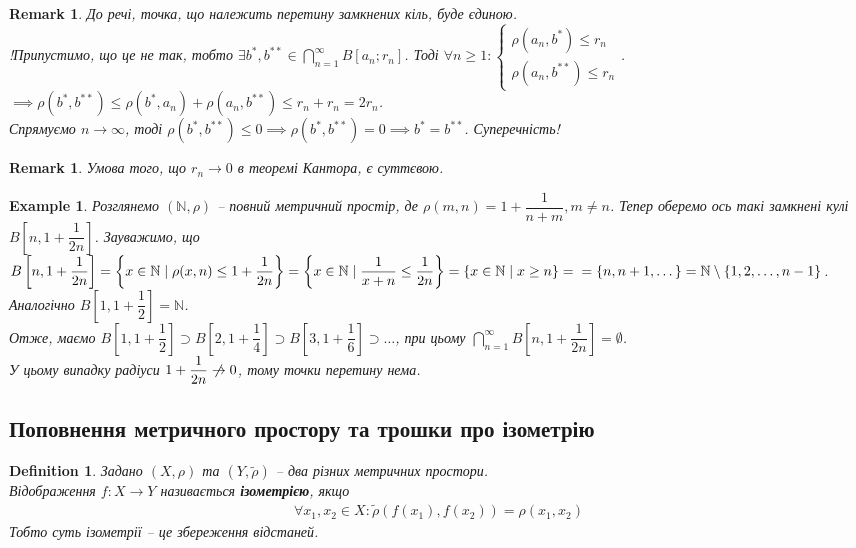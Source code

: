 \documentclass[a4paper, 10pt]{article}
\theoremstyle{theoremdd}
\theoremstyle{theoremdd}
\newtheorem{definition}[theorem]{Definition}
\theoremstyle{theoremdd}
\theoremstyle{theoremdd}
\newtheorem{example}[theorem]{Example}
\theoremstyle{theoremdd}
\theoremstyle{theoremdd}
\newtheorem{remark}[theorem]{Remark}
\theoremstyle{theoremdd}
\theoremstyle{theoremdd}
\begin{document}
\begin{remark}
До речі, точка, що належить перетину замкнених кіль, буде єдиною.\\
!Припустимо, що це не так, тобто $\exists b^*, b^{**} \in \displaystyle \bigcap_{n=1}^\infty B[a_n;r_n]$. Тоді $\forall n \geq 1: \begin{cases} \rho(a_n, b^*) \leq r_n \\ \rho(a_n, b^{**}) \leq r_n \end{cases}$.\\
$\implies \rho(b^*, b^{**}) \leq \rho(b^*,a_n) + \rho(a_n, b^{**}) \leq r_n + r_n = 2r_n$.\\
Спрямуємо $n \to \infty$, тоді $\rho(b^*,b^{**}) \leq 0 \implies \rho(b^*,b^{**}) = 0 \implies b^{*} = b^{**}$. Суперечність!
\end{remark}

\begin{remark}
Умова того, що $r_n \to 0$ в теоремі Кантора, є суттєвою.
\end{remark}

\begin{example}
Розглянемо $(\mathbb{N}, \rho)$ -- повний метричний простір, де $\rho(m,n) = 1 +\dfrac{1}{n+m},m \neq n$. Тепер оберемо ось такі замкнені кулі $B\left[ n, 1 + \dfrac{1}{2n}\right]$. Зауважимо, що\\
$B\left[n, 1 + \dfrac{1}{2n} \right] = \left\{x \in \mathbb{N} \mid \rho(x,n) \leq 1 + \dfrac{1}{2n} \right\} = \left\{ x \in \mathbb{N} \mid \dfrac{1}{x+n} \leq \dfrac{1}{2n} \right\} = \{x \in \mathbb{N} \mid x \geq n\} = \\ = \{n,n+1,\dots\} = \mathbb{N} \setminus \{1,2,\dots,n-1\}$.\\
Аналогічно $B\left[ 1, 1 + \dfrac{1}{2}\right] = \mathbb{N}$.\\
Отже, маємо $B\left[1, 1 + \dfrac{1}{2}\right] \supset B\left[ 2, 1 + \dfrac{1}{4} \right] \supset B\left[3, 1 + \dfrac{1}{6}\right] \supset \dots$, при цьому $\displaystyle\bigcap_{n=1}^\infty B\left[n, 1 + \dfrac{1}{2n}\right] = \emptyset$.\\
У цьому випадку радіуси $1 + \dfrac{1}{2n} \centernot\to 0$, тому точки перетину нема.
\end{example}

\subsection{Поповнення метричного простору та трошки про ізометрію}
\begin{definition}
Задано $(X,\rho)$ та $(Y, \tilde{\rho})$ -- два різних метричних простори.\\
Відображення $f \colon X \to Y$ називається \textbf{ізометрією}, якщо
\begin{align*}
\forall x_1,x_2 \in X: \tilde{\rho}(f(x_1),f(x_2)) = \rho(x_1,x_2)
\end{align*}
Тобто суть ізометрії -- це збереження відстаней.
\end{definition}
\end{document}

